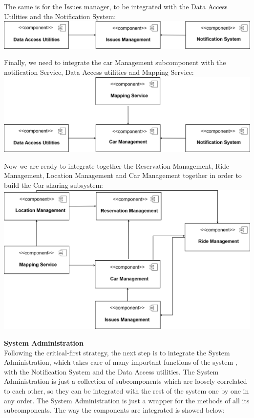 \documentclass{article}
\begin{document}
\begin{flushleft}
    The same is for the Issues manager, to be integrated with the Data Access Utilities and the Notification System:\\
 \vspace{1cm}
  \includegraphics[scale=0.15]{Diagramma10}
    \break \break
    
    Finally, we need to integrate the car Management subcomponent with the notification Service, Data Access utilities and Mapping Service:\\
     \vspace{1cm}
  \includegraphics[scale=0.15]{Diagramma11}
   
  
  \newpage
  Now we are ready to integrate together the Reservation Management, Ride Management, Location Management and Car Management together in order to build the Car sharing subsystem:\\
   \vspace{1cm}
  \includegraphics[scale=0.15]{Diagramma5}
 \newpage
    
  \textbf{System Administration} \\
  Following the critical-first strategy, the next step is to integrate the System Administration, which takes care of many important functions of the system ,  with the Notification System and the Data Access utilities. The System Administration is just a collection of subcomponents which are loosely correlated to each other, so they can be integrated with the rest of the system one by one in any order. The System Administration is just a wrapper for the methods of all its subcomponents. The way the components are integrated is showed below:\\
   \vspace{1cm}
  

\end{flushleft}
\end{document}
